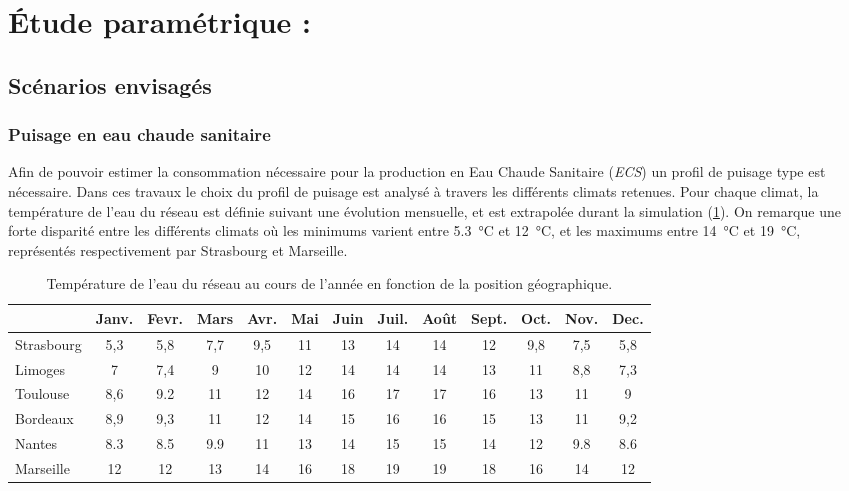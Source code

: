 \section{Étude paramétrique :} %
\label{sec:etude_parametrique_}
\subsection{Scénarios envisagés} %
\label{sub:scenarios_envisages}
\subsubsection{Puisage en eau chaude sanitaire} %
\label{ssub:puisage_en_eau_chaude_sanitaire}

Afin de pouvoir estimer la consommation nécessaire pour la production en Eau Chaude
Sanitaire (\emph{ECS}) un profil de puisage type est nécessaire. Dans ces travaux le
choix du profil de puisage est analysé à travers les différents climats retenues. Pour
chaque climat, la température de l’eau du réseau est définie suivant une évolution
mensuelle, et est extrapolée durant la simulation (\ref{tab:temp_eau}). On remarque une forte
disparité entre les différents climats où les minimums varient entre \SI{5.3}{\celsius} et
\SI{12}{\celsius}, et les maximums entre \SI{14}{\celsius} et \SI{19}{\celsius},
représentés respectivement par Strasbourg et Marseille.
\begin{table}
\centering
\begin{tabular}{l*{12}{c}}
    \toprule
               & Janv. & Fevr. & Mars & Avr. & Mai & Juin & Juil. & Août & Sept. & Oct. & Nov. & Dec. \\
    \midrule
    Strasbourg & 5,3   & 5,8   & 7,7  & 9,5  & 11  & 13   & 14    & 14   & 12    & 9,8  & 7,5  & 5,8  \\
    Limoges    & 7     & 7,4   & 9    & 10   & 12  & 14   & 14    & 14   & 13    & 11   & 8,8  & 7,3  \\
    Toulouse   & 8,6   & 9.2   & 11   & 12   & 14  & 16   & 17    & 17   & 16    & 13   & 11   & 9    \\
    Bordeaux   & 8,9   & 9,3   & 11   & 12   & 14  & 15   & 16    & 16   & 15    & 13   & 11   & 9,2  \\
    Nantes     & 8.3   & 8.5   & 9.9  & 11   & 13  & 14   & 15    & 15   & 14    & 12   & 9.8  & 8.6  \\
    Marseille  & 12    & 12    & 13   & 14   & 16  & 18   & 19    & 19   & 18    & 16   & 14   & 12   \\
    \bottomrule
\end{tabular}
\caption{Température de l'eau du réseau au cours de l'année en fonction de la
         position géographique.}
         \label{tab:temp_eau}
\end{table}


